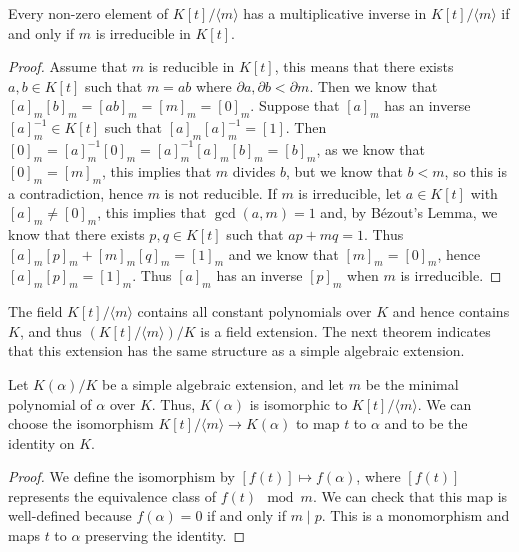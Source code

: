 \begin{theorem} \label{thm:irreducible-mod-field}
	Every non-zero element of $K[t] /\langle m\rangle$ has a multiplicative inverse in $K[t] /\langle m\rangle$ if and only if $m$ is irreducible in $K[t]$.
\end{theorem}

\begin{proof}
	Assume that \(m\) is reducible in \(K[t]\), this means that there exists \(a,b \in K[t]\) such that \(m = ab\) where \(\partial a,\partial b < \partial m\). Then we know that \([a]_m[b]_m = [ab]_m = [m]_m = [0]_m\). Suppose that \([a]_m\) has an inverse \([a]_m^{-1} \in K[t]\) such that \([a]_m[a]_m^{-1} = [1]\). Then \([0]_m = [a]_m^{-1}[0]_m = [a]_m^{-1}[a]_m[b]_m = [b]_m\), as we know that \([0]_m = [m]_m\), this implies that \(m\) divides \(b\), but we know that \(b < m\), so this is a contradiction, hence \(m\) is not reducible. 
	If \(m\) is irreducible, let \(a \in K[t]\) with \([a]_m \neq [0]_m\), this implies that \(\gcd(a,m)=1\) and, by Bézout's Lemma, we know that there exists \(p,q \in K[t]\) such that \(ap + mq = 1\). Thus \([a]_m[p]_m + [m]_m[q]_m = [1]_m\) and we know that \([m]_m = [0]_m\), hence \([a]_m[p]_m = [1]_m\). Thus \([a]_m\) has an inverse \([p]_m\) when \(m\) is irreducible.
\end{proof}

The field $K[t] / \langle m \rangle$ contains all constant polynomials over $K$ and hence contains $K$, and thus $\left(K[t] / \langle m \rangle \right) / K$ is a field extension. The next theorem indicates that this extension has the same structure as a simple algebraic extension.

\begin{theorem}
 Let $K(\alpha) / K$ be a simple algebraic extension, and let \(m\) be the minimal polynomial of \(\alpha\) over \(K\). Thus, $K(\alpha)$ is isomorphic to $K[t] /\langle m\rangle$. We can choose the isomorphism $K[t] /\langle m\rangle \rightarrow K(\alpha)$ to map $t$ to $\alpha$ and to be the identity on $K$.
\end{theorem}

\begin{proof}
We define the isomorphism by $[f(t)] \mapsto f(\alpha)$, where $[f(t)]$ represents the equivalence class of $f(t)\mod m$. We can check that this map is well-defined because $f(\alpha)=0$ if and only if $m \mid p$. This is a monomorphism and maps \(t\) to \(\alpha\) preserving the identity.
\end{proof}

